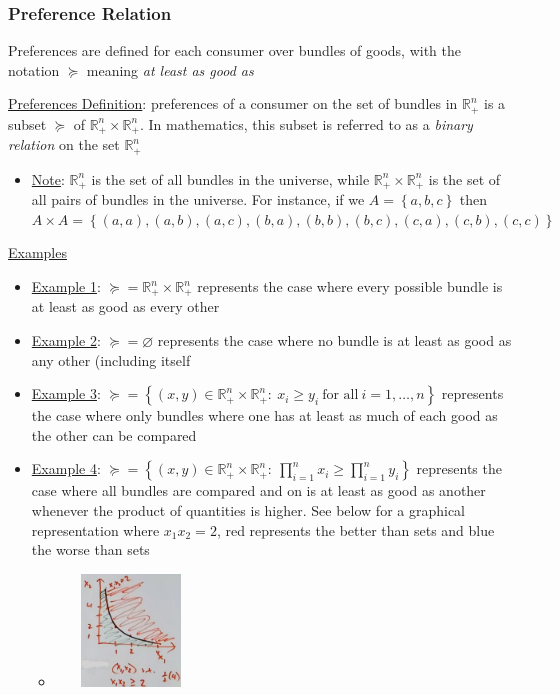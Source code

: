 \documentclass{article}
\begin{document}
\subsubsection{Preference Relation}
Preferences are defined for each consumer over bundles of goods, with the notation $\succeq$ meaning \textit{at least as good as} \par \vspace{0.3em}
  \underline{Preferences Definition}: preferences of a consumer on the set of bundles in $\mathbb{R}_{+}^{n}$ is a subset $\succeq$ of $\mathbb{R}_{+}^{n} \times \mathbb{R}_{+}^{n}$. In mathematics, this subset is referred to as a \textit{binary relation} on the set $\mathbb{R}_{+}^{n}$
  \begin{itemize}
    \item  \underline{Note}: $\mathbb{R}_{+}^{n}$ is the set of all bundles in the universe, while $\mathbb{R}_{+}^{n} \times \mathbb{R}_{+}^{n}$ is the set of all pairs of bundles in the universe. For instance, if we $A = \left\{a, b, c\right\}$ then  $A \times A = \left\{(a,a), (a,b), (a,c), (b,a), (b,b), (b,c), (c,a), (c,b), (c,c) \right\}$
  \end{itemize}
  \par
  \underline{Examples}
  \begin{itemize}
    \item  \underline{Example 1}: $\succeq = \mathbb{R}_{+}^{n} \times \mathbb{R}_{+}^{n}$ represents the case where every possible bundle is at least as good as every other
    \item  \underline{Example 2}: $\succeq = \varnothing$ represents the case where no bundle is at least as good as any other (including itself
    \item  \underline{Example 3}: $\succeq = \left\{ (x,y) \in \mathbb{R}_{+}^{n} \times \mathbb{R}_{+}^{n}: \ x_{i} \geq y_{i} \ \text{for all} \ i = 1, \dots, n \right\}$ represents the case where only bundles where one has at least as much of each good as the other can be compared
    \item  \underline{Example 4}: $\succeq = \left\{ (x,y) \in \mathbb{R}_{+}^{n} \times \mathbb{R}_{+}^{n}: \ \prod_{i=1}^{n} x_{i} \geq \prod_{i=1}^{n} y_{i} \right\}$ represents the case where all bundles are compared and on is at least as good as another whenever the product of quantities is higher. See below for a graphical representation where $x_{1}x_{2} = 2$, red represents the better than sets and blue the worse than sets
    \begin{itemize}
      \item  \includegraphics[width=4cm, height=3cm]{pic12}
    \end{itemize}
  \end{itemize}
  \par
\vspace{6mm}
\end{document}
